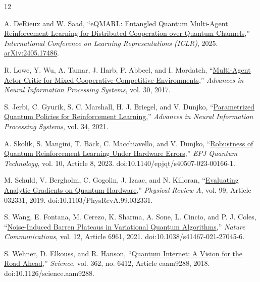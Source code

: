 \documentclass[12pt]{article}
\begin{document}
\newpage
{\fontsize{9}{10.5}\selectfont
\begin{thebibliography}{12}
\setlength{\itemsep}{0pt}
\setlength{\parsep}{0pt}
\setlength{\parskip}{0pt}

A. DeRieux and W. Saad,
``\href{https://openreview.net/forum?id=cR5GTis5II}{eQMARL: Entangled Quantum Multi-Agent Reinforcement Learning for Distributed Cooperation over Quantum Channels},''
\textit{International Conference on Learning Representations (ICLR)}, 2025.
\href{https://arxiv.org/abs/2405.17486}{arXiv:2405.17486}.

R. Lowe, Y. Wu, A. Tamar, J. Harb, P. Abbeel, and I. Mordatch,
``\href{https://proceedings.neurips.cc/paper_files/paper/2017/hash/68a9750337a418a86fe06c1991a1d64c-Abstract.html}{Multi-Agent Actor-Critic for Mixed Cooperative-Competitive Environments},''
\textit{Advances in Neural Information Processing Systems}, vol. 30, 2017.

S. Jerbi, C. Gyurik, S. C. Marshall, H. J. Briegel, and V. Dunjko,
``\href{https://proceedings.neurips.cc/paper/2021/hash/eec96a7f788e88184c0e713456026f3f-Abstract.html}{Parametrized Quantum Policies for Reinforcement Learning},''
\textit{Advances in Neural Information Processing Systems}, vol. 34, 2021.

A. Skolik, S. Mangini, T. B\"ack, C. Macchiavello, and V. Dunjko,
``\href{https://doi.org/10.1140/epjqt/s40507-023-00166-1}{Robustness of Quantum Reinforcement Learning Under Hardware Errors},''
\textit{EPJ Quantum Technology}, vol. 10, Article 8, 2023.
doi:10.1140/epjqt/s40507-023-00166-1.

M. Schuld, V. Bergholm, C. Gogolin, J. Izaac, and N. Killoran,
``\href{https://doi.org/10.1103/PhysRevA.99.032331}{Evaluating Analytic Gradients on Quantum Hardware},''
\textit{Physical Review A}, vol. 99, Article 032331, 2019.
doi:10.1103/PhysRevA.99.032331.

S. Wang, E. Fontana, M. Cerezo, K. Sharma, A. Sone, L. Cincio, and P. J. Coles,
``\href{https://doi.org/10.1038/s41467-021-27045-6}{Noise-Induced Barren Plateaus in Variational Quantum Algorithms},''
\textit{Nature Communications}, vol. 12, Article 6961, 2021.
doi:10.1038/s41467-021-27045-6.

S. Wehner, D. Elkouss, and R. Hanson,
``\href{https://doi.org/10.1126/science.aam9288}{Quantum Internet: A Vision for the Road Ahead},''
\textit{Science}, vol. 362, no. 6412, Article eaam9288, 2018.
doi:10.1126/science.aam9288.


\end{thebibliography}}
\end{document}
